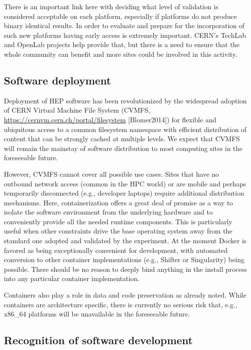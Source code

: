 \documentclass[12pt,a4paper]{article}
\begin{document}
There is an important link here with deciding what level of validation
is considered acceptable on each platform, especially if platforms do
not produce binary identical results. In order to evaluate and prepare
for the incorporation of such new platforms having early access is
extremely important. CERN's TechLab and OpenLab projects help provide
that, but there is a need to ensure that the whole community can benefit
and more sites could be involved in this activity.

\hypertarget{software-deployment}{%
\subsection{Software deployment}\label{software-deployment}}

Deployment of HEP software has been revolutionized by the widespread
adoption of CERN Virtual Machine File System (CVMFS,
\href{https://cernvm.cern.ch/portal/filesystem}{{https://cernvm.cern.ch/portal/filesystem}}
{[}Blomer2014{]}) for flexible and ubiquitous access to a common
filesystem namespace with efficient distribution of content that can be
strongly cached at multiple levels. We expect that CVMFS will remain the
mainstay of software distribution to most computing sites in the
foreseeable future.

However, CVMFS cannot cover all possible use cases. Sites that have no
outbound network access (common in the HPC world) or are mobile and
perhaps temporarily disconnected (e.g., developer laptops) require
additional distribution mechanisms. Here, containerization offers a
great deal of promise as a way to isolate the software environment from
the underlying hardware and to conveniently provide all the needed
runtime components. This is particularly useful when other constraints
drive the base operating system away from the standard one adopted and
validated by the experiment. At the moment Docker is favored as being
exceptionally convenient for development, with automated conversion to
other container implementations (e.g., Shifter or Singularity) being
possible. There should be no reason to deeply bind anything in the
install process into any particular container implementation.

Containers also play a role in data and code preservation as already
noted. While containers are architecture specific, there is currently no
serious risk that, e.g., x86\_64 platforms will be unavailable in the
foreseeable future.

\hypertarget{recognition-of-software-development}{%
\subsection{Recognition of software
development}\label{recognition-of-software-development}}
\end{document}
